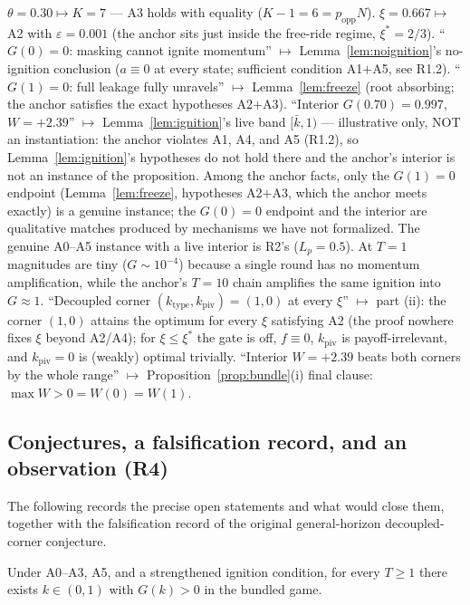 \begin{remark}[R3 --- map to the numerical anchors (v9 S11, $T=10$, $\theta=0.30$, $\xi=0.667$, $\pi_b=0.2$)]\label{rem:anchormap}
$\theta=0.30\mapsto K=7$ --- A3 holds with equality ($K-1=6=p_{\mathrm{opp}}N$).
$\xi=0.667\mapsto$ A2 with $\varepsilon=0.001$ (the anchor sits just inside the free-ride
regime, $\xi^*=2/3$). ``$G(0)=0$: masking cannot ignite momentum'' $\mapsto$
Lemma~\ref{lem:noignition}'s no-ignition conclusion ($a\equiv 0$ at every state; sufficient
condition A1$+$A5, see R1.2). ``$G(1)=0$: full leakage fully unravels'' $\mapsto$
Lemma~\ref{lem:freeze} (root absorbing; the anchor satisfies the exact hypotheses A2$+$A3).
``Interior $G(0.70)=0.997$, $W=+2.39$'' $\mapsto$ Lemma~\ref{lem:ignition}'s live band
$[\bar k,1)$ --- illustrative only, NOT an instantiation: the anchor violates A1, A4, and A5
(R1.2), so Lemma~\ref{lem:ignition}'s hypotheses do not hold there and the anchor's interior
is not an instance of the proposition. Among the anchor facts, only the $G(1)=0$ endpoint
(Lemma~\ref{lem:freeze}, hypotheses A2$+$A3, which the anchor meets exactly) is a genuine
instance; the $G(0)=0$ endpoint and the interior are qualitative matches produced by
mechanisms we have not formalized. The genuine A0--A5 instance with a live interior is R2's
($L_p=0.5$). At $T=1$ magnitudes are tiny ($G\sim 10^{-4}$) because a single round has no
momentum amplification, while the anchor's $T=10$ chain amplifies the same ignition into
$G\approx 1$. ``Decoupled corner $(k_{\mathrm{type}},k_{\mathrm{piv}})=(1,0)$ at every $\xi$''
$\mapsto$ part (ii): the corner $(1,0)$ attains the optimum for every $\xi$ satisfying A2
(the proof nowhere fixes $\xi$ beyond A2/A4); for $\xi\le\xi^*$ the gate is off, $f\equiv 0$,
$k_{\mathrm{piv}}$ is payoff-irrelevant, and $k_{\mathrm{piv}}=0$ is (weakly) optimal
trivially. ``Interior $W=+2.39$ beats both corners by the whole range'' $\mapsto$
Proposition~\ref{prop:bundle}(i) final clause: $\max W>0=W(0)=W(1)$.
\end{remark}

\subsection*{Conjectures, a falsification record, and an observation (R4)}

The following records the precise open statements and what would close them, together with the
falsification record of the original general-horizon decoupled-corner conjecture.

\begin{restatedconjecture}
Under A0--A3, A5, and a strengthened ignition condition, for every $T\ge 1$ there exists
$k\in(0,1)$ with $G(k)>0$ in the bundled game.
\end{restatedconjecture}

